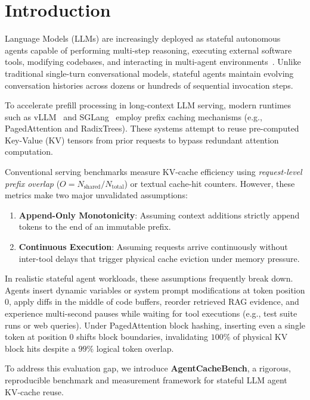 \documentclass[10pt,journal,compsoc]{IEEEtran}
\begin{document}
\section{Introduction}
 Language Models (LLMs) are increasingly deployed as stateful autonomous agents capable of performing multi-step reasoning, executing external software tools, modifying codebases, and interacting in multi-agent environments~\cite{liu2024agentbench, jimenez2024swebench}. Unlike traditional single-turn conversational models, stateful agents maintain evolving conversation histories across dozens or hundreds of sequential invocation steps.

To accelerate prefill processing in long-context LLM serving, modern runtimes such as vLLM~\cite{kwon2023vllm} and SGLang~\cite{zheng2024sglang} employ prefix caching mechanisms (e.g., PagedAttention and RadixTrees). These systems attempt to reuse pre-computed Key-Value (KV) tensors from prior requests to bypass redundant attention computation. 

Conventional serving benchmarks measure KV-cache efficiency using \emph{request-level prefix overlap} ($O = N_{\text{shared}} / N_{\text{total}}$) or textual cache-hit counters. However, these metrics make two major unvalidated assumptions:
\begin{enumerate}
    \item \textbf{Append-Only Monotonicity}: Assuming context additions strictly append tokens to the end of an immutable prefix.
    \item \textbf{Continuous Execution}: Assuming requests arrive continuously without inter-tool delays that trigger physical cache eviction under memory pressure.
\end{enumerate}

In realistic stateful agent workloads, these assumptions frequently break down. Agents insert dynamic variables or system prompt modifications at token position 0, apply diffs in the middle of code buffers, reorder retrieved RAG evidence, and experience multi-second pauses while waiting for tool executions (e.g., test suite runs or web queries). Under PagedAttention block hashing, inserting even a single token at position 0 shifts block boundaries, invalidating $100\%$ of physical KV block hits despite a $99\%$ logical token overlap.

To address this evaluation gap, we introduce \textbf{AgentCacheBench}, a rigorous, reproducible benchmark and measurement framework for stateful LLM agent KV-cache reuse.
\end{document}
